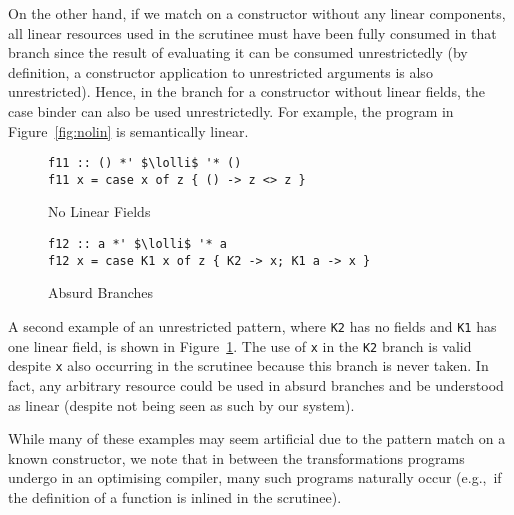 \documentclass[acmsmall,review,anonymous,screen]{acmart}
\newcommand{\incode}[1]{\lstinline{#1}}
\newcommand{\lolli}{\multimap}
\begin{document}
On the other hand, if we match on a constructor without any linear components,
all linear resources used in the scrutinee must have been fully consumed in
that branch since the result of evaluating it can be consumed unrestrictedly
(by definition, a constructor application to unrestricted arguments is also
unrestricted).
%
Hence, in the branch for a constructor without linear fields, the case
binder can also be used unrestrictedly. For example, the program in
Figure~\ref{fig:nolin} is semantically linear.
%
\begin{figure}[h]
 \begin{minipage}{0.5\textwidth}
\begin{notyet}
\begin{lstlisting}
f11 :: () *' $\lolli$ '* ()
f11 x = case x of z { () -> z <> z }
\end{lstlisting}
\end{notyet}
\vspace{-0.5cm}
\caption{No Linear Fields\label{fig:nolin}}
\end{minipage}%
\begin{minipage}{0.5\textwidth}
\begin{limitation}
\begin{lstlisting}
f12 :: a *' $\lolli$ '* a
f12 x = case K1 x of z { K2 -> x; K1 a -> x }
\end{lstlisting}
\end{limitation}
\vspace{-0.5cm}
\caption{Absurd Branches\label{fig:absurd}}
\end{minipage}
\end{figure}
%
A second example of an unrestricted pattern, where \incode{K2} has no fields
and \incode{K1} has one linear field, is shown in Figure~\ref{fig:absurd}.
The use of \incode{x} in the \incode{K2} branch is valid despite \incode{x}
also occurring in the scrutinee because this branch is never taken. In fact,
any arbitrary resource could be used in absurd branches and be understood as
linear (despite not being seen as such by our system).

While many of these examples may seem artificial due to the pattern match on a
known constructor, we note that in between the transformations programs
undergo in an optimising compiler, many such programs naturally occur (e.g.,~if
the definition of a function is inlined in the scrutinee).
%
\end{document}
